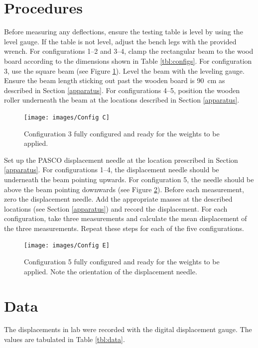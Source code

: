 \documentclass[12 pt]{article}
\begin{document}
\section{Procedures} \label{procedures}
Before measuring any deflections, ensure the testing table is level by using the level gauge. If the table is not level, adjust the bench legs with the provided wrench. For configurations 1--2 and 3--4, clamp the rectangular beam to the wood board according to the dimensions shown in Table \ref{tbl:configs}. For configuration \num{3}, use the square beam (see Figure \ref{fig:config_3_img}). Level the beam with the leveling gauge. Ensure the beam length sticking out past the wooden board is \qty{90}{\cm} as described in Section \ref{apparatus}. For configurations 4--5, position the wooden roller underneath the beam at the locations described in Section \ref{apparatus}.

\begin{figure}[htbp]
\centering
\texttt{[image: images/Config C]}
\caption{Configuration \num{3} fully configured and ready for the weights to be applied.}
\label{fig:config_3_img}
\end{figure}

Set up the PASCO displacement needle at the location prescribed in Section \ref{apparatus}. For configurations 1--4, the displacement needle should be underneath the beam pointing upwards. For configuration \num{5}, the needle should be above the beam pointing downwards (see Figure \ref{fig:config_5_img}). Before each measurement, zero the displacement needle. Add the appropriate masses at the described locations (see Section \ref{apparatus}) and record the displacement. For each configuration, take three measurements and calculate the mean displacement of the three measurements. Repeat these steps for each of the five configurations.

\begin{figure}[htbp]
\centering
\texttt{[image: images/Config E]}
\caption{Configuration \num{5} fully configured and ready for the weights to be applied. Note the orientation of the displacement needle.}
\label{fig:config_5_img}
\end{figure}

\section{Data} \label{data}
The displacements in lab were recorded with the digital displacement gauge. The values are tabulated in Table \ref{tbl:data}.
\end{document}
